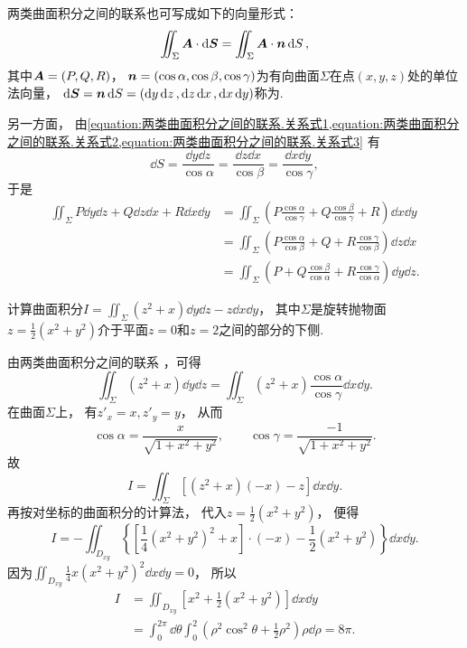 两类曲面积分之间的联系也可写成如下的向量形式：
\begin{equation}\label{equation:线积分与面积分.两类曲面积分之间的联系的向量形式}
	\iint_\Sigma \boldsymbol{A} \cdot \dd{\boldsymbol{S}}
	=\iint_\Sigma \boldsymbol{A} \cdot \boldsymbol{n} \dd{S},
\end{equation}
其中\(\boldsymbol{A}=(P,Q,R)\)，
\(\boldsymbol{n}=(\cos\alpha,\cos\beta,\cos\gamma)\)为有向曲面\(\Sigma\)在点\((x,y,z)\)处的单位法向量，
\(\dd{\boldsymbol{S}}
= \boldsymbol{n}\dd{S}
= (\dd{y}\dd{z},\dd{z}\dd{x},\dd{x}\dd{y})\)称为.

另一方面，
由\cref{equation:两类曲面积分之间的联系.关系式1,equation:两类曲面积分之间的联系.关系式2,equation:两类曲面积分之间的联系.关系式3}
有\[
	\dd{S}
	= \frac{\dd{y}\dd{z}}{\cos\alpha}
	= \frac{\dd{z}\dd{x}}{\cos\beta}
	= \frac{\dd{x}\dd{y}}{\cos\gamma},
\]
于是\begin{align*}
	\iint_\Sigma P\dd{y}\dd{z}+Q\dd{z}\dd{x}+R\dd{x}\dd{y}
	&= \iint_\Sigma \left(P\frac{\cos\alpha}{\cos\gamma}+Q\frac{\cos\beta}{\cos\gamma}+R\right)\dd{x}\dd{y} \\
	&= \iint_\Sigma \left(P\frac{\cos\alpha}{\cos\beta}+Q+R\frac{\cos\gamma}{\cos\beta}\right)\dd{z}\dd{x} \\
	&= \iint_\Sigma \left(P+Q\frac{\cos\beta}{\cos\alpha}+R\frac{\cos\gamma}{\cos\alpha}\right)\dd{y}\dd{z}.
\end{align*}

\begin{example}
计算曲面积分\(I=\iint_\Sigma (z^2+x) \dd{y}\dd{z} - z \dd{x}\dd{y}\)，
其中\(\Sigma\)是旋转抛物面\(z = \frac{1}{2}(x^2+y^2)\)介于平面\(z=0\)和\(z=2\)之间的部分的下侧.
\begin{solution}
由两类曲面积分之间的联系 ，可得\[
	\iint_\Sigma (z^2+x) \dd{y}\dd{z}
	= \iint_\Sigma (z^2+x) \frac{\cos\alpha}{\cos\gamma} \dd{x}\dd{y}.
\]
在曲面\(\Sigma\)上，
有\(z'_x = x, z'_y = y\)，
从而\[
	\cos\alpha
	= \frac{x}{\sqrt{1+x^2+y^2}},
	\qquad
	\cos\gamma
	= \frac{-1}{\sqrt{1+x^2+y^2}}.
\]
故\[
	I = \iint_\Sigma [(z^2+x)(-x) - z] \dd{x}\dd{y}.
\]
再按对坐标的曲面积分的计算法，
代入\(z = \frac{1}{2}(x^2+y^2)\)，
便得\[
	I = - \iint_{D_{xy}} \left\{
		\left[
			\frac{1}{4} (x^2+y^2)^2
			+ x
		\right] \cdot (-x)
		- \frac{1}{2} (x^2+y^2)
	\right\} \dd{x}\dd{y}.
\]
因为\(\iint_{D_{xy}} \frac{1}{4} x(x^2+y^2)^2 \dd{x}\dd{y} = 0\)，
所以\begin{align*}
	I
	&= \iint_{D_{xy}} \left[x^2+\frac{1}{2}(x^2+y^2)\right] \dd{x}\dd{y} \\
	&= \int_0^{2\pi} \dd{\theta}
		\int_0^2 \left(\rho^2 \cos^2\theta + \frac{1}{2} \rho^2\right) \rho \dd{\rho}
	= 8\pi.
\end{align*}
\end{solution}
\end{example}
